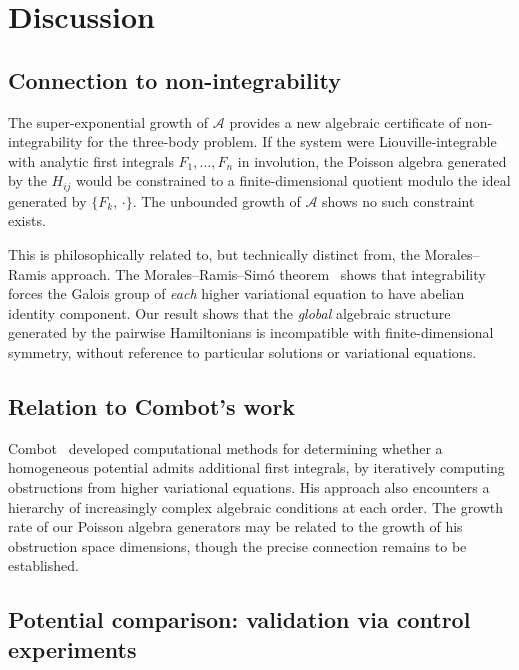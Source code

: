 \documentclass[11pt,a4paper]{article}
\theoremstyle{remark}
\newcommand{\pb}[2]{\{#1,\,#2\}}
\newcommand{\cA}{\mathcal{A}}
\begin{document}
\section{Discussion}

\subsection{Connection to non-integrability}

The super-exponential growth of $\cA$ provides a new algebraic
certificate of non-integrability for the three-body problem.  If
the system were Liouville-integrable with analytic first
integrals $F_1, \ldots, F_n$ in involution, the Poisson algebra
generated by the $H_{ij}$ would be constrained to a
finite-dimensional quotient modulo the ideal generated by
$\pb{F_k}{\cdot}$.  The unbounded growth of $\cA$ shows no such
constraint exists.

This is philosophically related to, but technically distinct from,
the Morales--Ramis approach.  The Morales--Ramis--Sim\'{o}
theorem~\cite{morales-ramis-simo-2007} shows that integrability
forces the Galois group of \emph{each} higher variational
equation to have abelian identity component.  Our result shows
that the \emph{global} algebraic structure generated by the
pairwise Hamiltonians is incompatible with finite-dimensional
symmetry, without reference to particular solutions or
variational equations.

\subsection{Relation to Combot's work}

Combot~\cite{combot-2013} developed computational methods for
determining whether a homogeneous potential admits additional
first integrals, by iteratively computing obstructions from higher
variational equations.  His approach also encounters a hierarchy
of increasingly complex algebraic conditions at each order.
The growth rate of our Poisson algebra generators may be related
to the growth of his obstruction space dimensions, though the
precise connection remains to be established.

\subsection{Potential comparison: validation via control experiments}
\end{document}
